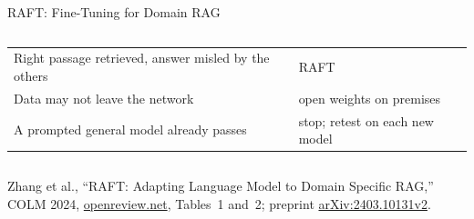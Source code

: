 \begin{frame}{RAFT: Fine-Tuning for Domain RAG}
\begin{columns}[T,onlytextwidth]
{\begin{tabular}{>{\raggedright\arraybackslash}p{3.0cm} >{\raggedright\arraybackslash}p{2.1cm}}
        \addlinespace[0.15em]
        Right passage retrieved, answer misled by the others & RAFT \\
        \addlinespace[0.15em]
        Data may not leave the network & open weights on premises \\
        \addlinespace[0.15em]
        A prompted general model already passes & stop; retest on each new model \\
        \bottomrule
      \end{tabular}\par}
  \end{columns}
  \vspace{0.1em}
  {\scriptsize Zhang et al., ``RAFT: Adapting Language Model to Domain Specific RAG,'' COLM 2024, \href{https://openreview.net/forum?id=rzQGHXNReU}{openreview.net}, Tables~1 and~2; preprint \href{https://arxiv.org/abs/2403.10131v2}{arXiv:2403.10131v2}.\par}
\end{frame}
